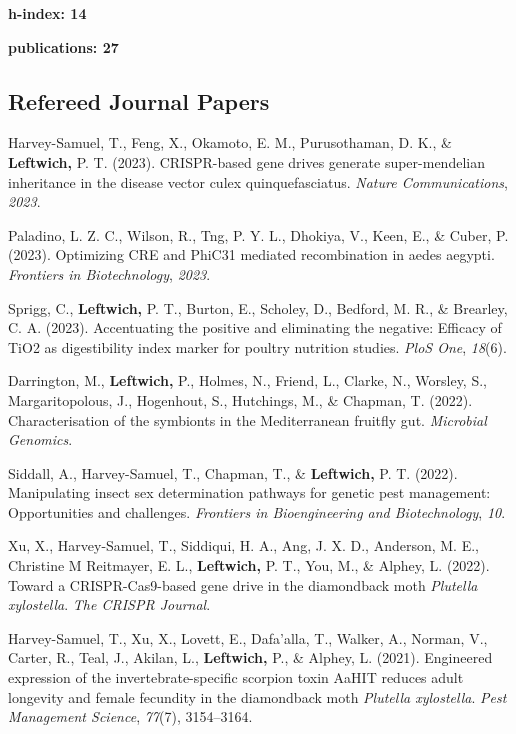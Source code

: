 \documentclass[11pt, a4paper]{awesome-cv}
\begin{document}
\textbf{h-index: 14}

\textbf{publications: 27} \endgroup

\hypertarget{refereed-journal-papers}{%
\subsection{Refereed Journal Papers}\label{refereed-journal-papers}}

\begingroup
\setlength{\parindent}{0.2in}

\hypertarget{refs_journals}{}
\leavevmode\hypertarget{ref-26}{}%
Harvey-Samuel, T., Feng, X., Okamoto, E. M., Purusothaman, D. K., \&
\textbf{Leftwich,} P. T. (2023). CRISPR-based gene drives generate
super-mendelian inheritance in the disease vector culex
quinquefasciatus. \emph{Nature Communications}, \emph{2023}.

\leavevmode\hypertarget{ref-25}{}%
Paladino, L. Z. C., Wilson, R., Tng, P. Y. L., Dhokiya, V., Keen, E., \&
Cuber, P. (2023). Optimizing CRE and PhiC31 mediated recombination in
aedes aegypti. \emph{Frontiers in Biotechnology}, \emph{2023}.

\leavevmode\hypertarget{ref-24}{}%
Sprigg, C., \textbf{Leftwich,} P. T., Burton, E., Scholey, D., Bedford,
M. R., \& Brearley, C. A. (2023). Accentuating the positive and
eliminating the negative: Efficacy of TiO2 as digestibility index marker
for poultry nutrition studies. \emph{PloS One}, \emph{18}(6).

\leavevmode\hypertarget{ref-22}{}%
Darrington, M., \textbf{Leftwich,} P., Holmes, N., Friend, L., Clarke,
N., Worsley, S., Margaritopolous, J., Hogenhout, S., Hutchings, M., \&
Chapman, T. (2022). Characterisation of the symbionts in the
{Mediterranean} fruitfly gut. \emph{Microbial Genomics}.

\leavevmode\hypertarget{ref-23}{}%
Siddall, A., Harvey-Samuel, T., Chapman, T., \& \textbf{Leftwich,} P. T.
(2022). Manipulating insect sex determination pathways for genetic pest
management: Opportunities and challenges. \emph{Frontiers in
Bioengineering and Biotechnology}, \emph{10}.

\leavevmode\hypertarget{ref-21}{}%
Xu, X., Harvey-Samuel, T., Siddiqui, H. A., Ang, J. X. D., Anderson, M.
E., Christine M Reitmayer, E. L., \textbf{Leftwich,} P. T., You, M., \&
Alphey, L. (2022). Toward a CRISPR-Cas9-based gene drive in the
diamondback moth \emph{{Plutella} xylostella}. \emph{The CRISPR
Journal}.

\leavevmode\hypertarget{ref-19}{}%
Harvey-Samuel, T., Xu, X., Lovett, E., Dafa'alla, T., Walker, A.,
Norman, V., Carter, R., Teal, J., Akilan, L., \textbf{Leftwich,} P., \&
Alphey, L. (2021). Engineered expression of the invertebrate-specific
scorpion toxin {AaHIT} reduces adult longevity and female fecundity in
the diamondback moth \emph{{Plutella} xylostella}. \emph{Pest Management
Science}, \emph{77}(7), 3154--3164.
\end{document}
